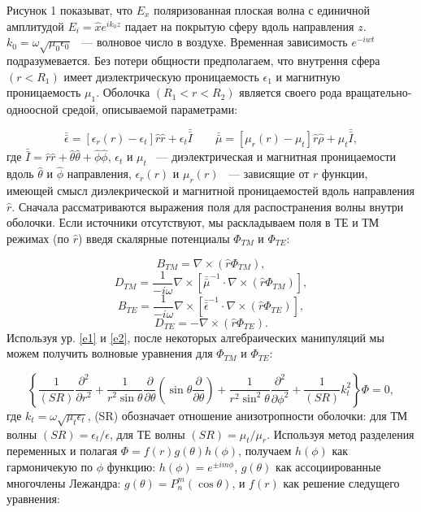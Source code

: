 \documentclass[a4paper, 12pt]{article}
\newcommand{\dbar}[1]{\bar{\bar{#1}}}
\begin{document}
Рисунок 1 показыват, что $E_x$ поляризованная плоская волна с единичной амплитудой
$E_i=\hat{x}e^{ik_0z}$ падает на покрытую сферу вдоль направления $z$. 
$k_0=\omega\sqrt{\mu_0\epsilon_0}$ ~--- волновое число в воздухе. Временная 
зависимость $e^{-iwt}$ подразумевается. Без потери общности предполагаем, что
внутрення сфера $(r<R_1)$ имеет диэлектрическую проницаемость $\epsilon_1$ и
магнитную проницаемость $\mu_1$. Оболочка $(R_1<r<R_2)$ является своего рода
вращательно-одноосной средой, описываемой параметрами:

\begin{equation}\label{e1}
	\dbar{\epsilon} = [\epsilon_r(r)-\epsilon_t]\hat{r}\hat{r}+\epsilon_t\dbar{I}
	\qquad
	\dbar{\mu} = [\mu_r(r)-\mu_t]\hat{r}\hat{\rho} + \mu_t \dbar{I},
\end{equation}
где $\dbar{I}=\hat{r}\hat{r}+\hat{\theta}\hat{\theta}+\hat{\phi}\hat{\phi}$,
$\epsilon_t$ и $\mu_t$ ~--- диэлектрическая и магнитная проницаемости вдоль
$\hat{\theta}$ и $\hat{\phi}$ направления, $\epsilon_r(r)$ и $\mu_r(r)$ ~--- 
зависящие от $r$ функции, имеющей смысл диэлекрической и магнитной проницаемостей 
вдоль направления $\hat{r}$. 
Сначала рассматриваются выражения поля для распостранения волны 
внутри оболочки. Если источники отсутствуют, мы раскладываем поля в ТЕ и ТМ
режимах (по $\hat{r}$) введя скалярные потенциалы $\Phi_{TM}$ и $\Phi_{TE}$:

\begin{equation*}
	B_{TM} = \nabla \times (\hat{r}\Phi_{TM}),
\end{equation*}
\begin{equation*}
	D_{TM} = \frac{1}{-i\omega}{\nabla\times[\dbar{\mu}^{-1} \cdot \nabla \times
	(\hat{r}\Phi_{TM})]},
\end{equation*}
\begin{equation}\label{e2}
B_{TE} = \frac{1}{-i\omega}{\nabla\times[\dbar{\epsilon}^{-1} \cdot \nabla \times
	(\hat{r}\Phi_{TE})]},	
\end{equation}
\begin{equation*}
	D_{TE} = - \nabla \times (\hat{r}\Phi_{TE}).
\end{equation*}
Используя ур. \eqref{e1} и \eqref{e2}, после некоторых алгебраических манипуляций
мы можем получить волновые уравнения для $\Phi_{TM}$ и $\Phi_{TE}$:

\begin{equation}\label{e3}
\left\{
\frac{1}{(SR)}
\frac{\partial^2}{\partial r^2} + \frac{1}{r^2\sin\theta}
\frac{\partial}{\partial\theta}
\left(\sin\theta \frac{\partial}{\partial\theta}\right) +
\frac{1}{r^2\sin^2\theta}\frac{\partial^2}{\partial\phi^2} + 
\frac{1}{(SR)}k^2_t
\right\}\Phi = 0,
\end{equation}
где $k_t = \omega \sqrt{\mu_t\epsilon_t}$, (SR) обозначает отношение анизотропности
оболочки: для ТМ волны $(SR) = \epsilon_t/\epsilon$, для ТЕ волны $(SR) = 
\mu_t/\mu_r$. Используя метод разделения переменных и полагая 
$\Phi = f(r)g(\theta)h(\phi)$, получаем $h(\phi)$ как гармоничекую по $\phi$
функцию: $h(\phi) = e^{\pm im\phi}$, $g(\theta)$ как ассоциированные многочлены 
Лежандра:  $g(\theta) = P_n^m(\cos\theta)$, и $f(r)$ как решение следущего 
уравнения:
\end{document}
